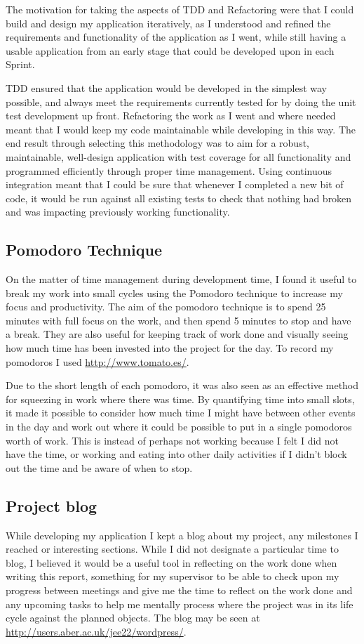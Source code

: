 The motivation for taking the aspects of TDD and Refactoring were that I could build and design my application iteratively, as I understood and refined the requirements and functionality of the application as I went, while still having a usable application from an early stage that could be developed upon in each Sprint.

TDD ensured that the application would be developed in the simplest way possible, and always meet the requirements currently tested for by doing the unit test development up front. Refactoring the work as I went and where needed meant that I would keep my code maintainable while developing in this way. The end result through selecting this methodology was to aim for a robust, maintainable, well-design application with test coverage for all functionality and programmed efficiently through proper time management. Using continuous integration meant that I could be sure that whenever I completed a new bit of code, it would be run against all existing tests to check that nothing had broken and was impacting previously working functionality.

\subsection{Pomodoro Technique}
On the matter of time management during development time, I found it useful to break my work into small cycles using the Pomodoro technique\cite{citeulike:14021988} to increase my focus and productivity. The aim of the pomodoro technique is to spend 25 minutes with full focus on the work, and then spend 5 minutes to stop and have a break. They are also useful for keeping track of work done and visually seeing how much time has been invested into the project for the day. To record my pomodoros I used \url{http://www.tomato.es/}.
 
Due to the short length of each pomodoro, it was also seen as an effective method for squeezing in work where there was time. By quantifying time into small slots, it made it possible to consider how much time I might have between other events in the day and work out where it could be possible to put in a single pomodoros worth of work. This is instead of perhaps not working because I felt I did not have the time, or working and eating into other daily activities if I didn't block out the time and be aware of when to stop.

\subsection{Project blog}
While developing my application I kept a blog about my project, any milestones I reached or interesting sections. While I did not designate a particular time to blog, I believed it would be a useful tool in reflecting on the work done when writing this report, something for my supervisor to be able to check upon my progress between meetings and give me the time to reflect on the work done and any upcoming tasks to help me mentally process where the project was in its life cycle against the planned objects. The blog may be seen at \url{http://users.aber.ac.uk/jee22/wordpress/}.
